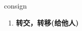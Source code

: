 
\begin{frame}
{\huge consign}
\begin{center}
\begin{enumerate}\Large
  \item \textbf{转交，转移(给他人)}
\end{enumerate}
\end{center}
\end{frame}
